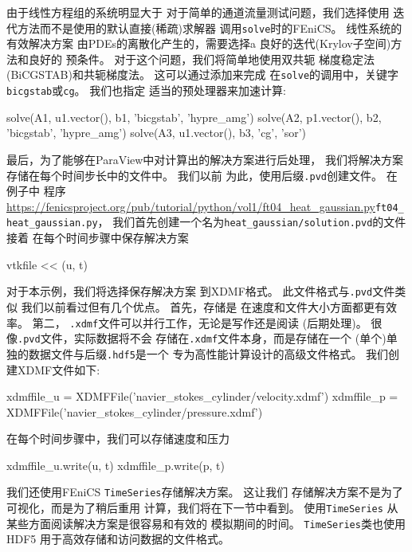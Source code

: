 由于线性方程组的系统明显大于
对于简单的通道流量测试问题，我们选择使用
迭代方法而不是使用的默认直接(稀疏)求解器
调用\texttt{solve}时的FEniCS。 线性系统的有效解决方案
由PDEs的离散化产生的，需要选择a
良好的迭代(Krylov子空间)方法和良好的
预条件。 对于这个问题，我们将简单地使用双共轭
梯度稳定法(BiCGSTAB)和共轭梯度法。 这可以通过添加来完成
在\texttt{solve}的调用中，关键字\texttt{bicgstab}或\texttt{cg}。 我们也指定
适当的预处理器来加速计算:


\begin{python}
solve(A1, u1.vector(), b1, 'bicgstab', 'hypre_amg')
solve(A2, p1.vector(), b2, 'bicgstab', 'hypre_amg')
solve(A3, u1.vector(), b3, 'cg', 'sor')
\end{python}

最后，为了能够在ParaView中对计算出的解决方案进行后处理，
我们将解决方案存储在每个时间步长中的文件中。 我们以前
为此，使用后缀\texttt{.pvd}创建文件。 在例子中
程序
\url{https://fenicsproject.org/pub/tutorial/python/vol1/ft04_heat_gaussian.py}{\nolinkurl{ft04_heat_gaussian.py}}，
我们首先创建一个名为\verb!heat_gaussian/solution.pvd!的文件 接着
在每个时间步骤中保存解决方案
\begin{python}
vtkfile << (u, t)
\end{python}

对于本示例，我们将选择保存解决方案
到XDMF格式。 此文件格式与\texttt{.pvd}文件类似
我们以前看过但有几个优点。 首先，存储是
在速度和文件大小方面都更有效率。 第二，
\texttt{.xdmf}文件可以并行工作，无论是写作还是阅读
(后期处理)。 很像\texttt{.pvd}文件，实际数据将不会
存储在\texttt{.xdmf}文件本身，而是存储在一个
(单个)单独的数据文件与后缀\texttt{.hdf5}是一个
专为高性能计算设计的高级文件格式。
我们创建XDMF文件如下:

\begin{python}
xdmffile_u = XDMFFile('navier_stokes_cylinder/velocity.xdmf')
xdmffile_p = XDMFFile('navier_stokes_cylinder/pressure.xdmf')
\end{python}
在每个时间步骤中，我们可以存储速度和压力
\begin{python}[language=Python,style=graycolor]
xdmffile_u.write(u, t)
xdmffile_p.write(p, t)
\end{python}


我们还使用FEniCS \texttt{TimeSeries}存储解决方案。 这让我们
存储解决方案不是为了可视化，而是为了稍后重用
计算，我们将在下一节中看到。 使用\texttt{TimeSeries}
从某些方面阅读解决方案是很容易和有效的
模拟期间的时间。 \texttt{TimeSeries}类也使用HDF5
用于高效存储和访问数据的文件格式。

